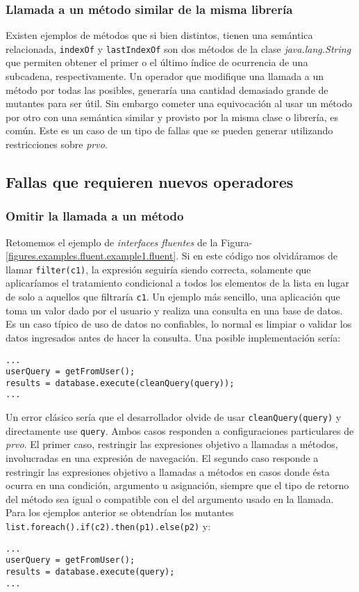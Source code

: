 \subsubsection{Llamada a un m\'etodo similar de la misma librer\'ia}

Existen ejemplos de m\'etodos que si bien distintos, tienen una sem\'antica relacionada, \texttt{indexOf} y \texttt{lastIndexOf} son dos m\'etodos de la clase \emph{java.lang.String} que permiten obtener el primer o el \'ultimo \'indice de ocurrencia de una subcadena, respectivamente. Un operador que modifique una llamada a un m\'etodo por todas las posibles, generar\'ia una cantidad demasiado grande de mutantes para ser \'util. Sin embargo cometer una equivocaci\'on al usar un m\'etodo por otro con una sem\'antica similar y provisto por la misma clase o librer\'ia, es com\'un. Este es un caso de un tipo de fallas que se pueden generar utilizando restricciones sobre \emph{prvo}.

\subsection{Fallas que requieren nuevos operadores}

\subsubsection{Omitir la llamada a un m\'etodo}

Retomemos el ejemplo de \emph{interfaces fluentes} de la Figura-\ref{figures.examples.fluent.example1.fluent}. Si en este c\'odigo nos olvid\'aramos de llamar \texttt{filter(c1)}, la expresi\'on seguir\'ia siendo correcta, solamente que aplicar\'iamos el tratamiento condicional a todos los elementos de la lista en lugar de solo a aquellos que filtrar\'ia \texttt{c1}. Un ejemplo m\'as sencillo, una aplicaci\'on que toma un valor dado por el usuario y realiza una consulta en una base de datos. Es un caso t\'ipico de uso de datos no confiables, lo normal es limpiar o validar los datos ingresados antes de hacer la consulta. Una posible implementaci\'on ser\'ia:
\begin{lstlisting}
...
userQuery = getFromUser();
results = database.execute(cleanQuery(query));
...
\end{lstlisting}
Un error cl\'asico ser\'ia que el desarrollador olvide de usar \texttt{cleanQuery(query)} y directamente use \texttt{query}. Ambos casos responden a configuraciones particulares de \emph{prvo}. El primer caso, restringir las expresiones objetivo a llamadas a m\'etodos, involucradas en una expresi\'on de navegaci\'on. El segundo caso responde a restringir las expresiones objetivo a llamadas a m\'etodos en casos donde \'esta ocurra en una condici\'on, argumento u asignaci\'on, siempre que el tipo de retorno del m\'etodo sea igual o compatible con el del argumento usado en la llamada. Para los ejemplos anterior se obtendr\'ian los mutantes \lstinline|list.foreach().if(c2).then(p1).else(p2)| y:
\begin{lstlisting}
...
userQuery = getFromUser();
results = database.execute(query);
...
\end{lstlisting}

